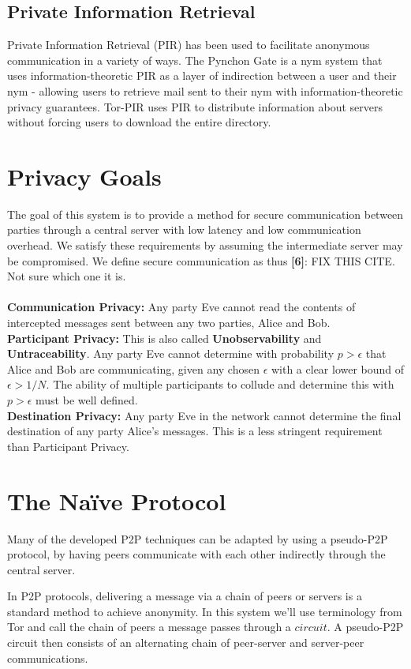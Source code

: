 \documentclass[twocolumn,11pt,english]{article}
\begin{document}
\subsection{Private Information Retrieval} Private Information Retrieval (PIR) has been used to facilitate anonymous communication in a variety of ways. The Pynchon Gate \cite{sassaman:wpes2005} is a nym system that uses information-theoretic PIR as a layer of indirection between a user and their nym - allowing users to retrieve mail sent to their nym with information-theoretic privacy guarantees. Tor-PIR \cite{MittalOTBG11} uses PIR to distribute information about servers without forcing users to download the entire directory. 

\section{Privacy Goals}
The goal of this system is to provide a method for secure communication between parties through a central server with low latency and low communication overhead. We satisfy these requirements by assuming the intermediate server may be compromised. We define secure communication as thus \textbf{[6]}: FIX THIS CITE. Not sure which one it is.
\\\\\textbf{Communication Privacy:} Any party Eve cannot read the contents of intercepted messages sent between any two parties, Alice and Bob. 
\\\textbf{Participant Privacy:} This is also called \textbf{Unobservability} and \textbf{Untraceability}. Any party Eve cannot determine with probability $p > \epsilon$ that Alice and Bob are communicating, given any chosen $\epsilon$ with a clear lower bound of $\epsilon > 1/N$. The ability of multiple participants to collude and determine this with $p > \epsilon$ must be well defined.
\\\textbf{Destination Privacy:} Any party Eve in the network cannot determine the final destination of any party Alice's messages. This is a less stringent requirement than Participant Privacy.

\section{The Na\"ive Protocol}
Many of the developed P2P techniques can be adapted by using a pseudo-P2P protocol, by having peers communicate with each other indirectly through the central server. 

In P2P protocols, delivering a message via a chain of peers or servers is a standard method to achieve anonymity. In this system we'll use terminology from Tor and call the chain of peers a message passes through a $circuit$. A pseudo-P2P circuit then consists of an alternating chain of peer-server and server-peer communications.
\end{document}
